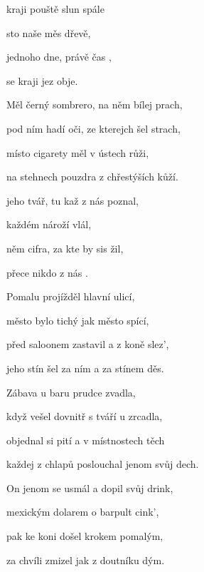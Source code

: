 

\zs
{} kraji pouště slun spále

sto naše  měs dřevě,

jednoho dne, právě čas  ,

se  kraji  jez obje.
\ks

\zs
Měl černý sombrero, na něm bílej prach,

pod ním hadí oči, ze kterejch šel strach,

místo cigarety měl v ústech růži,

na stehnech pouzdra z chřestýších kůží.
\ks

\zr
{} jeho tvář, tu kaž z nás poznal,

 každém nároží  vlál,

 něm cifra, za kte by sis žil,

 přece nikdo z nás .
\kr

\zs
Pomalu projížděl hlavní ulicí,

město bylo tichý jak město spící,

před saloonem zastavil a z koně slez',

jeho stín šel za ním a za stínem děs.
\ks

\zs
Zábava u baru prudce zvadla,

když vešel dovnitř s tváří u zrcadla,

objednal si pití a v místnostech těch

každej z chlapů poslouchal jenom svůj dech.
\ks

\zr  \kr

\zs
On jenom se usmál a dopil svůj drink,

mexickým dolarem o barpult cink',

pak ke koni došel krokem pomalým,

za chvíli zmizel jak z doutníku dým.
\ks

\kp







